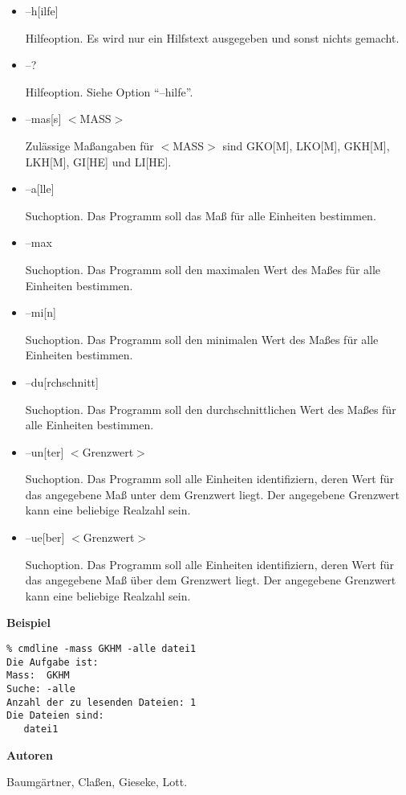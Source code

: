 \begin{itemize}
\item --h[ilfe] 

Hilfeoption.  Es wird nur ein Hilfstext ausgegeben und sonst nichts gemacht.

\item --?

Hilfeoption. Siehe Option ``--hilfe''.

\item --mas[s] $<$MASS$>$

Zul\"assige Ma{\ss}angaben f\"ur $<$MASS$>$ sind GKO[M],  LKO[M], GKH[M],
LKH[M], GI[HE] und  LI[HE].

\item --a[lle]

Suchoption. Das Programm soll das Ma{\ss} f\"ur alle Einheiten bestimmen.

\item --max

Suchoption. Das Programm soll den maximalen Wert des Ma{\ss}es f\"ur alle
Einheiten bestimmen.

\item --mi[n]

Suchoption.  Das Programm soll den minimalen Wert des Ma{\ss}es f\"ur alle
Einheiten bestimmen.

\item --du[rchschnitt]

Suchoption.  Das Programm soll den durchschnittlichen Wert des Ma{\ss}es
f\"ur alle Einheiten bestimmen.

\item --un[ter] $<$Grenzwert$>$

Suchoption.  Das Programm soll alle Einheiten identifiziern,
deren Wert f\"ur das angegebene Ma{\ss} unter dem Grenzwert liegt.
Der angegebene Grenzwert kann eine beliebige Realzahl sein.

\item --ue[ber] $<$Grenzwert$>$

Suchoption.  Das Programm soll alle Einheiten identifiziern,
deren Wert f\"ur das angegebene Ma{\ss} \"uber dem Grenzwert liegt.
Der angegebene Grenzwert kann eine beliebige Realzahl sein.

\end{itemize}



\medskip
\textbf{\large Beispiel}

{\small
\begin{verbatim}
% cmdline -mass GKHM -alle datei1
Die Aufgabe ist:
Mass:  GKHM
Suche: -alle
Anzahl der zu lesenden Dateien: 1
Die Dateien sind:
   datei1
\end{verbatim}
}


\medskip
\textbf{\large Autoren}

Baumg\"artner, Cla{\ss}en, Gieseke, Lott.
